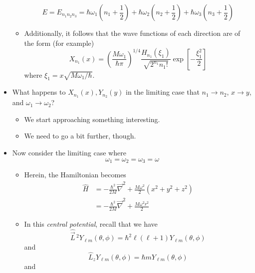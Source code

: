 \documentclass[../notes.tex]{subfiles}
\begin{document}
\begin{itemize}
\begin{itemize}
\begin{equation*}
            E = E_{n_1n_2n_3}
            = \hbar\omega_1\left( n_1+\frac{1}{2} \right)+\hbar\omega_2\left( n_2+\frac{1}{2} \right)+\hbar\omega_3\left( n_3+\frac{1}{2} \right)
        \end{equation*}
        \item Additionally, it follows that the wave functions of each direction are of the form (for example)
        \begin{equation*}
            X_{n_1}(x) = \left( \frac{M\omega_1}{\hbar\pi} \right)^{1/4}\frac{H_{n_1}(\xi_1)}{\sqrt{2^{n_1}n_1!}}\exp[-\frac{\xi_1^2}{2}]
        \end{equation*}
        where $\xi_1=x\sqrt{M\omega_1/\hbar}$.
    \end{itemize}
    \item What happens to $X_{n_1}(x),Y_{n_2}(y)$ in the limiting case that $n_1\to n_2$, $x\to y$, and $\omega_1\to\omega_2$?
    \begin{itemize}
        \item We start approaching something interesting.
        \item We need to go a bit further, though.
    \end{itemize}
    \item Now consider the limiting case where
    \begin{equation*}
        \omega_1 = \omega_2
        = \omega_3
        = \omega
    \end{equation*}
    \begin{itemize}
        \item Herein, the Hamiltonian becomes
        \begin{align*}
            \hat{H} &= -\frac{\hbar^2}{2M}\vec{\nabla}^2+\frac{M\omega^2}{2}(x^2+y^2+z^2)\\
            &= -\frac{\hbar^2}{2M}\vec{\nabla}^2+\frac{M\omega^2r^2}{2}
        \end{align*}
        \item In this \emph{central potential}, recall that we have
        \begin{equation*}
            \hat{\vec{L}}{\,}^2Y_{\ell m}(\theta,\phi) = \hbar^2\ell(\ell+1)Y_{\ell m}(\theta,\phi)
        \end{equation*}
        and
        \begin{equation*}
            \hat{L}_zY_{\ell m}(\theta,\phi) = \hbar mY_{\ell m}(\theta,\phi)
        \end{equation*}
        and
        \begin{equation*}

\end{equation*}
\end{itemize}
\end{itemize}
\end{document}
